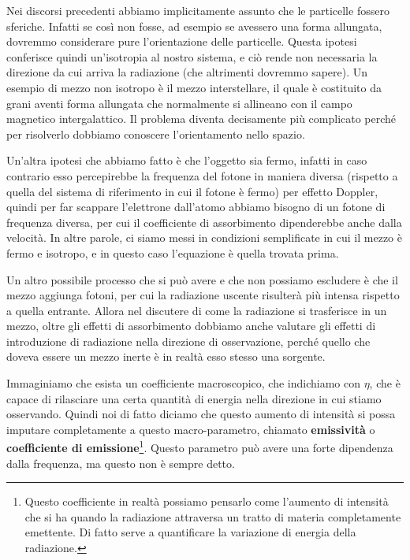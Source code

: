 Nei discorsi precedenti abbiamo implicitamente assunto che le particelle fossero sferiche. Infatti se così non fosse, ad esempio se avessero una forma allungata, dovremmo considerare pure l'orientazione delle particelle. Questa ipotesi conferisce quindi un'isotropia al nostro sistema, e ciò rende non necessaria la direzione da cui arriva la radiazione (che altrimenti dovremmo sapere). Un esempio di mezzo non isotropo è il mezzo interstellare, il quale è costituito da grani aventi forma allungata che normalmente si allineano con il campo magnetico intergalattico. Il problema diventa decisamente più complicato perché per risolverlo dobbiamo conoscere l'orientamento nello spazio.

Un'altra ipotesi che abbiamo fatto è che l'oggetto sia fermo, infatti in caso contrario esso percepirebbe la frequenza del fotone in maniera diversa (rispetto a quella del sistema di riferimento in cui il fotone è fermo) per effetto Doppler, quindi per far scappare l'elettrone dall'atomo abbiamo bisogno di un fotone di frequenza diversa, per cui il coefficiente di assorbimento dipenderebbe anche dalla velocità. In altre parole, ci siamo messi in condizioni semplificate in cui il mezzo è fermo e isotropo, e in questo caso l'equazione è quella trovata prima.

Un altro possibile processo che si può avere e che non possiamo escludere è che il mezzo aggiunga fotoni, per cui la radiazione uscente risulterà più intensa rispetto a quella entrante. Allora nel discutere di come la radiazione si trasferisce in un mezzo, oltre gli effetti di assorbimento dobbiamo anche valutare gli effetti di introduzione di radiazione nella direzione di osservazione, perché quello che doveva essere un mezzo inerte è in realtà esso stesso una sorgente.

Immaginiamo che esista un coefficiente macroscopico, che indichiamo con $\eta$, che è capace di rilasciare una certa quantità di energia nella direzione in cui stiamo osservando. Quindi noi di fatto diciamo che questo aumento di intensità si possa imputare completamente a questo macro-parametro, chiamato \textbf{emissività} o \textbf{coefficiente di emissione}\footnote{Questo coefficiente in realtà possiamo pensarlo come l'aumento di intensità che si ha quando la radiazione attraversa un tratto di materia completamente emettente. Di fatto serve a quantificare la variazione di energia della radiazione.}. Questo parametro può avere una forte dipendenza dalla frequenza, ma questo non è sempre detto. %

